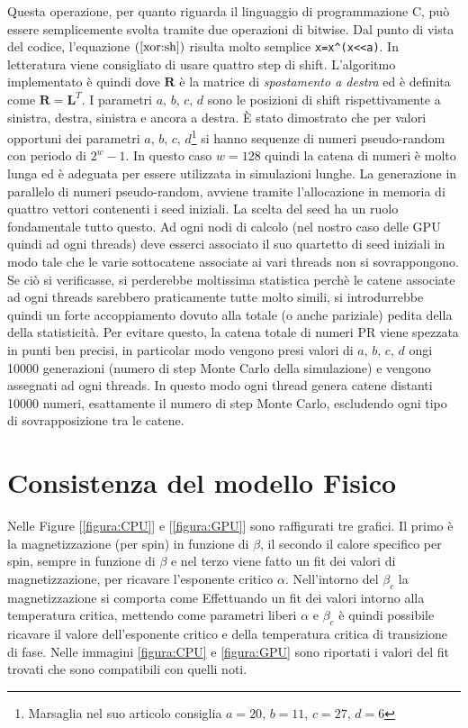 \documentclass[a4paper,12pt]{article}
\begin{document}
Questa operazione, per quanto riguarda il linguaggio di programmazione C, può essere semplicemente svolta tramite due operazioni di bitwise. Dal punto di vista del codice, 
l'equazione $(\ref{xor:sh})$ risulta molto semplice \texttt{x\;=\;x\;\^\;(x<<a)}. In letteratura viene consigliato di usare quattro step di shift. L'algoritmo implementato è quindi 
dove $\mathbf{R}$ è la matrice di \textit{spostamento a destra} ed è definita come $\mathbf{R} = \mathbf{L}^T$. I parametri $a,\, b,\, c,\, d$ sono le posizioni di shift rispettivamente a sinistra, destra, sinistra e ancora a destra. \`E stato dimostrato che per valori opportuni dei parametri $a,\, b,\, c,\, d$\footnote{Marsaglia nel suo articolo consiglia $a=20$, $b=11$, $c=27$, $d=6$} si hanno sequenze di numeri pseudo-random con periodo di $2^w-1$. In questo caso $w=128$ quindi la catena di numeri è molto lunga ed è adeguata per essere utilizzata in simulazioni lunghe. La generazione in parallelo di numeri pseudo-random, avviene tramite l'allocazione in memoria di quattro vettori contenenti i seed iniziali. La scelta del seed ha un ruolo fondamentale tutto questo. Ad ogni nodi di calcolo (nel nostro caso delle GPU quindi ad ogni threads) deve esserci associato il suo quartetto di seed iniziali in modo tale che le varie sottocatene associate ai vari threads non si sovrappongono. Se ciò si verificasse, si perderebbe moltissima statistica perchè le catene associate ad ogni threads sarebbero praticamente tutte molto simili, si introdurrebbe quindi un forte accoppiamento dovuto alla totale (o anche pariziale) pedita della della statisticità. Per evitare questo, la catena totale di numeri PR viene spezzata in punti ben precisi, in particolar modo vengono presi valori di $a,\, b,\, c,\, d$ ongi 10000 generazioni (numero di step Monte Carlo della simulazione) e vengono assegnati ad ogni threads. In questo modo ogni thread genera catene distanti 10000 numeri, esattamente il numero di step Monte Carlo, escludendo ogni tipo di sovrapposizione tra le catene.
\section{Consistenza del modello Fisico}
Nelle Figure [\ref{figura:CPU}] e [\ref{figura:GPU}] sono raffigurati tre grafici. Il primo è la magnetizzazione (per spin) in funzione di $\beta$, il secondo il calore specifico per spin, sempre in funzione di $\beta$ e nel terzo viene fatto un fit dei valori di magnetizzazione, per ricavare l'esponente critico $\alpha$. Nell'intorno del $\beta_c$ la magnetizzazione si comporta come
Effettuando un fit dei valori intorno alla temperatura critica, mettendo come parametri liberi $\alpha$ e $\beta_c$ è quindi possibile ricavare il valore dell'esponente critico e della temperatura critica di transizione di fase. Nelle immagini \ref{figura:CPU} e \ref{figura:GPU} sono riportati i valori del fit trovati che sono compatibili con quelli noti.
\end{document}
